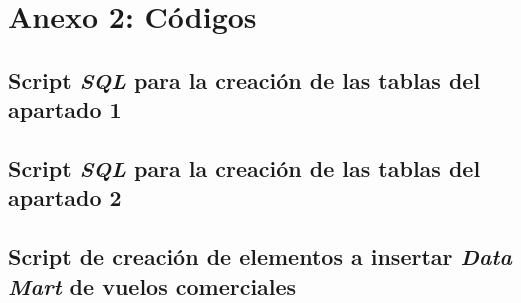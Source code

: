 \documentclass{article}
\begin{document}
\section{Anexo 2: Códigos}

\subsection{Script \textit{SQL} para la creación de las tablas del apartado 1}


\newpage
\subsection{Script \textit{SQL} para la creación de las tablas del apartado 2}


\newpage
\subsection{Script de creación de elementos a insertar \textit{Data Mart} de vuelos comerciales}



\newpage
{}


\end{document}
